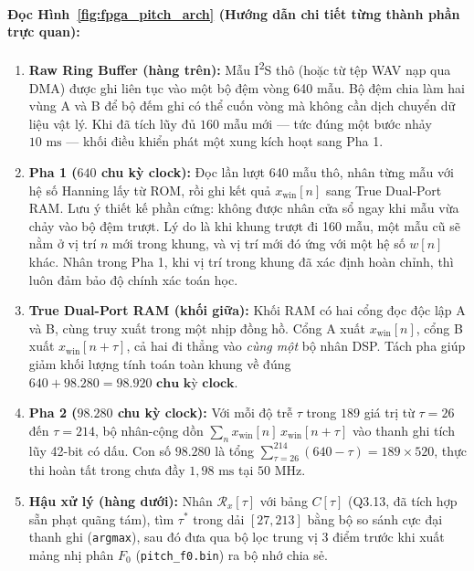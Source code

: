 \documentclass[11pt,a4paper]{article}
\begin{document}
\paragraph{Đọc Hình~\ref{fig:fpga_pitch_arch} (Hướng dẫn chi tiết từng thành phần trực quan):}
\begin{enumerate}
    \setlength{\itemsep}{1.5pt}
    \item \textbf{Raw Ring Buffer (hàng trên):} Mẫu I\textsuperscript{2}S thô (hoặc từ tệp WAV nạp qua DMA) được ghi liên tục vào một bộ đệm vòng 640 mẫu. Bộ đệm chia làm hai vùng A và B để bộ đếm ghi có thể cuốn vòng mà không cần dịch chuyển dữ liệu vật lý. Khi đã tích lũy đủ $160$ mẫu mới --- tức đúng một bước nhảy $10\text{ ms}$ --- khối điều khiển phát một xung kích hoạt sang Pha 1.
    \item \textbf{Pha 1 ($640$ chu kỳ clock):} Đọc lần lượt 640 mẫu thô, nhân từng mẫu với hệ số Hanning lấy từ ROM, rồi ghi kết quả $x_{\text{win}}[n]$ sang True Dual-Port RAM. Lưu ý thiết kế phần cứng: không được nhân cửa sổ ngay khi mẫu vừa chảy vào bộ đệm trượt. Lý do là khi khung trượt đi 160 mẫu, một mẫu cũ sẽ nằm ở vị trí $n$ mới trong khung, và vị trí mới đó ứng với một hệ số $w[n]$ khác. Nhân trong Pha 1, khi vị trí trong khung đã xác định hoàn chỉnh, thì luôn đảm bảo độ chính xác toán học.
    \item \textbf{True Dual-Port RAM (khối giữa):} Khối RAM có hai cổng đọc độc lập A và B, cùng truy xuất trong một nhịp đồng hồ. Cổng A xuất $x_{\text{win}}[n]$, cổng B xuất $x_{\text{win}}[n+\tau]$, cả hai đi thẳng vào \emph{cùng một} bộ nhân DSP. Tách pha giúp giảm khối lượng tính toán toàn khung về đúng $640 + 98.280 = \mathbf{98.920\text{ chu kỳ clock}}$.
    \item \textbf{Pha 2 ($98.280$ chu kỳ clock):} Với mỗi độ trễ $\tau$ trong $189$ giá trị từ $\tau=26$ đến $\tau=214$, bộ nhân-cộng dồn $\sum_n x_{\text{win}}[n]\,x_{\text{win}}[n+\tau]$ vào thanh ghi tích lũy 42-bit có dấu. Con số $98.280$ là tổng $\sum_{\tau=26}^{214}(640-\tau) = 189 \times 520$, thực thi hoàn tất trong chưa đầy $1{,}98\text{ ms}$ tại $50\text{ MHz}$.
    \item \textbf{Hậu xử lý (hàng dưới):} Nhân $\mathcal{R}_x[\tau]$ với bảng $C[\tau]$ (Q3.13, đã tích hợp sẵn phạt quãng tám), tìm $\tau^*$ trong dải $[27, 213]$ bằng bộ so sánh cực đại thanh ghi (\texttt{argmax}), sau đó đưa qua bộ lọc trung vị 3 điểm trước khi xuất mảng nhị phân $F_0$ (\texttt{pitch\_f0.bin}) ra bộ nhớ chia sẻ.
\end{enumerate}
\end{document}
